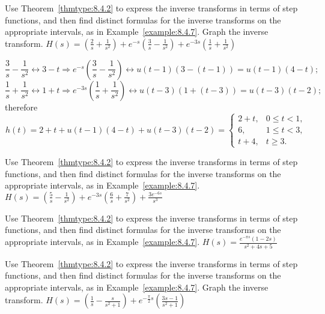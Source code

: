 \documentclass{ximera}
\begin{document}
\begin{problem}\label{exer:8.4.22} Use Theorem~\ref{thmtype:8.4.2} to express the inverse transforms in terms of step functions, and then find distinct formulas for the inverse transforms on the appropriate intervals, as in
Example~\ref{example:8.4.7}.  Graph the inverse transform.  $H(s)=\left(\frac{2}{s}+\frac{1}{s^2}\right)
+e^{-s}\left(\frac{3}{s}-\frac{1}{s^2}\right)+e^{-3s}\left(\frac{1}{s}+\frac{1}{s^2}\right)$

\begin{solution}
$$
\frac{3}{s}-\frac{1}{s^2}\leftrightarrow 3-t\Rightarrow
e^{-s}\left(\frac{3}{s}-\frac{1}{s^2}\right)\leftrightarrow
u(t-1)\left(3-(t-1)\right)=u(t-1)(4-t);
$$
$$
\frac{1}{s}+\frac{1}{s^2}\leftrightarrow 1+t\Rightarrow
e^{-3s}\left(\frac{1}{s}+\frac{1}{s^2}\right)\leftrightarrow
u(t-3)\left(1+(t-3)\right)=u(t-3)(t-2);
$$
therefore
$$
h(t)=2+t+u(t-1)(4-t)+u(t-3)(t-2)=\left\{\begin{array}{cl} 2+t,&
0\le t<1,\\  6,&1\le t<3,\\  t+4,&t\ge
3.\end{array}\right.
$$
\end{solution}
\end{problem}

\begin{problem}\label{exer:8.4.23} Use Theorem~\ref{thmtype:8.4.2} to express the inverse transforms in terms of step functions, and then find distinct formulas for the inverse transforms on the appropriate intervals, as in
Example~\ref{example:8.4.7}.
$H(s)=\left(\frac{5}{s}-\frac{1}{s^2}\right)
+e^{-3s}\left(\frac{6}{s}+\frac{7}{s^2}\right)+\frac{3e^{-6s}}{s^3}$
\end{problem}

\begin{problem}\label{exer:8.4.24}
Use Theorem~\ref{thmtype:8.4.2} to express the inverse transforms in terms of step functions, and then find distinct formulas for the inverse transforms on the appropriate intervals, as in
Example~\ref{example:8.4.7}.
$H(s)=\frac{e^{-\pi s} (1-2s)}{s^2+4s+5}$
\end{problem}

\begin{problem}\label{exer:8.4.25} Use Theorem~\ref{thmtype:8.4.2} to express the inverse transforms in terms of step functions, and then find distinct formulas for the inverse transforms on the appropriate intervals, as in
Example~\ref{example:8.4.7}.  Graph the inverse transform.
$H(s)=\left(\frac{1}{s}-\frac{s}{s^2+1}\right)+e^{-\frac{\pi}{2}s}\left(\frac{3s-1}{s^2+1}\right)$
\end{problem}
\end{document}
